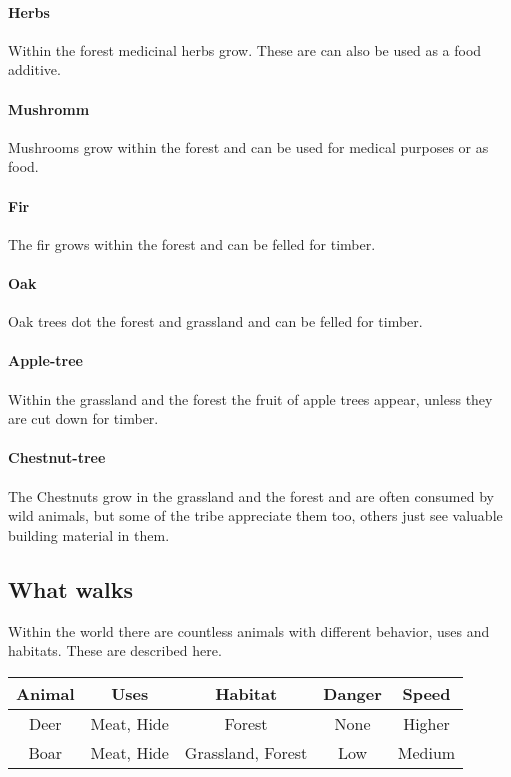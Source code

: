 \documentclass[a4paper]{book}
\begin{document}
\paragraph{Herbs}
Within the forest medicinal herbs grow. These are can also be used as a food
additive.

\paragraph{Mushromm}
Mushrooms grow within the forest and can be used for medical purposes or as
food.

\paragraph{Fir}
The fir grows within the forest and can be felled for timber.

\paragraph{Oak}
Oak trees dot the forest and grassland and can be felled for timber.

\paragraph{Apple-tree}
Within the grassland and the forest the fruit of apple trees appear, unless
they are cut down for timber.

\paragraph{Chestnut-tree}
The Chestnuts grow in the grassland and the forest and are often consumed by
wild animals, but some of the tribe appreciate them too, others just see
valuable building material in them.

\subsection{What walks}
Within the world there are countless animals with different behavior, uses and
habitats. These are described here.

\begin{longtable}{ccccc}
	\toprule
	Animal & Uses       & Habitat           & Danger & Speed  \\
	\midrule
	Deer   & Meat, Hide & Forest            & None   & Higher \\
	Boar   & Meat, Hide & Grassland, Forest & Low    & Medium \\
	\bottomrule
\end{longtable}
\end{document}
